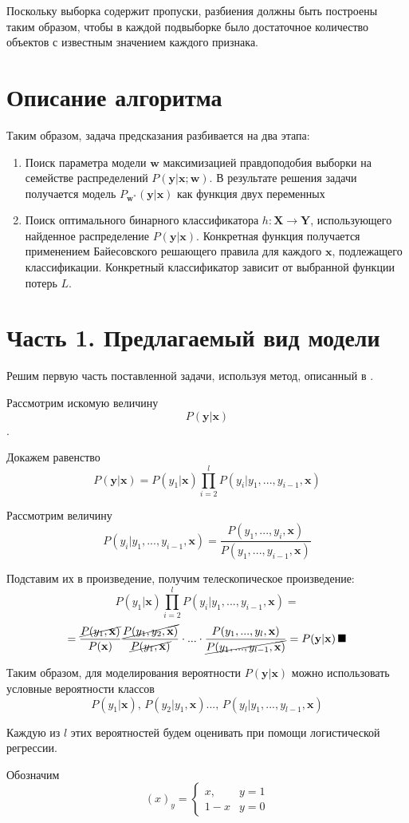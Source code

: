 \documentclass{ITaSconf}
\newcommand{\x}{\mathbf{x}}
\newcommand{\w}{\mathbf{w}}
\newcommand{\y}{\mathbf{y}}
\newcommand{\X}{\mathbf{X}}
\newcommand{\Y}{\mathbf{Y}}
\begin{document}
Поскольку выборка содержит пропуски, разбиения должны быть построены таким образом, чтобы в каждой подвыборке было достаточное количество объектов с известным значением каждого признака.

\section{Описание алгоритма}
Таким образом, задача предсказания разбивается на два этапа:
\begin{enumerate}
\item Поиск параметра модели $\w$ максимизацией правдоподобия выборки на семействе распределений $P(\y|\x;\w)$. В результате решения задачи получается модель $P_{\w^*}(\y|\x)$ как функция двух переменных
\item Поиск оптимального бинарного классификатора $h\colon \X\to\Y$, использующего найденное распределение $P(\y|\x)$. Конкретная функция получается применением Байесовского решающего правила для каждого $\x$, подлежащего классификации. Конкретный классификатор зависит от выбранной функции потерь $L$.
\end{enumerate}

\section{Часть 1. Предлагаемый вид модели}
Решим первую часть поставленной задачи, используя метод, описанный в \cite{weiwei2010}.

Рассмотрим искомую величину $$P(\y|\x)$$.

Докажем равенство $$P(\y|\x)=P(y_1|\x)\prod_{i=2}^lP(y_i|y_1,...,y_{i-1}, \x)$$

Рассмотрим величину $$P(y_i|y_1,...,y_{i-1},\x)=\frac{P(y_1,...,y_i,\x)}{P(y_1,...,y_{i-1},\x)}$$

Подставим их в произведение, получим телескопическое произведение: $$P(y_1|\x)\prod_{i=2}^lP(y_i|y_1,...,y_{i-1}, \x)=$$
$$=\frac{\cancel{P(y_1,\x)}}{P(\x)}\frac{\cancel{P(y_1,y_2,\x)}}{\cancel{P(y_1,\x)}}\cdot...\cdot\frac{P(y_1,...,y_l,\x)}{\cancel{P(y_1,...,y_{l-1},\x)}}=P(\y|\x)\,\blacksquare$$

Таким образом, для моделирования вероятности $P(\y|\x)$ можно использовать условные вероятности классов $$P(y_1|\x),\,P(y_2|y_1,\x)...,\,P(y_l|y_1,...,y_{l-1},\x)$$

Каждую из $l$ этих вероятностей будем оценивать при помощи логистической регрессии.

Обозначим $$(x)_{y}=\begin{cases}
x, & y = 1\\
1 - x & y = 0
\end{cases}$$
\end{document}
